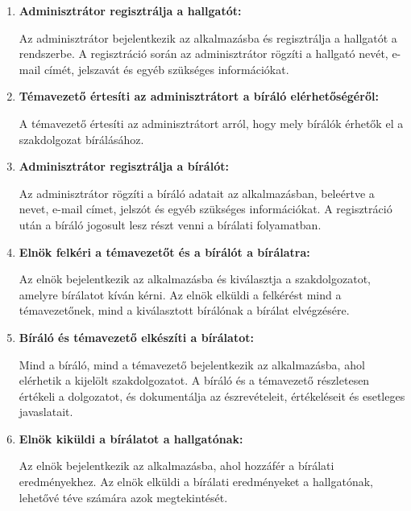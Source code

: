 \begin{enumerate}
\item \textbf{Adminisztrátor regisztrálja a hallgatót:}

Az adminisztrátor bejelentkezik az alkalmazásba és regisztrálja a hallgatót a rendszerbe.
A regisztráció során az adminisztrátor rögzíti a hallgató nevét, e-mail címét, jelszavát és egyéb szükséges információkat.

\item \textbf{Témavezető értesíti az adminisztrátort a bíráló elérhetőségéről:}

A témavezető értesíti az adminisztrátort arról, hogy mely bírálók érhetők el a szakdolgozat bírálásához. 

\item \textbf{Adminisztrátor regisztrálja a bírálót:}

Az adminisztrátor rögzíti a bíráló adatait az alkalmazásban, beleértve a nevet, e-mail címet, jelszót és egyéb szükséges információkat. A regisztráció után a bíráló jogosult lesz részt venni a bírálati folyamatban.

\item \textbf{Elnök felkéri a témavezetőt és a bírálót a bírálatra:}

Az elnök bejelentkezik az alkalmazásba és kiválasztja a szakdolgozatot, amelyre bírálatot kíván kérni. Az elnök elküldi a felkérést mind a témavezetőnek, mind a kiválasztott bírálónak a bírálat elvégzésére.

\item \textbf{Bíráló és témavezető elkészíti a bírálatot:}

Mind a bíráló, mind a témavezető bejelentkezik az alkalmazásba, ahol elérhetik a kijelölt szakdolgozatot. A bíráló és a témavezető részletesen értékeli a dolgozatot, és dokumentálja az észrevételeit, értékeléseit és esetleges javaslatait.

\item \textbf{Elnök kiküldi a bírálatot a hallgatónak:}

Az elnök bejelentkezik az alkalmazásba, ahol hozzáfér a bírálati eredményekhez.
Az elnök elküldi a bírálati eredményeket a hallgatónak, lehetővé téve számára azok megtekintését.
\end{enumerate}

\newpage

